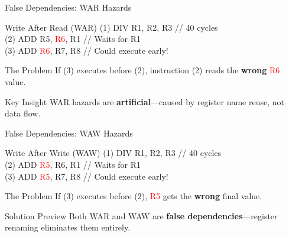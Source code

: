 \documentclass[aspectratio=169,12pt]{beamer}
\begin{document}
\begin{frame}{False Dependencies: WAR Hazards}
    \begin{exampleblock}{Write After Read (WAR)}
        {\ttfamily\footnotesize
        (1) DIV R1, R2, R3  // 40 cycles\\
        (2) ADD R5, \textcolor{red}{R6}, R1  // Waits for R1\\
        (3) ADD \textcolor{red}{R6}, R7, R8  // Could execute early!
        }
    \end{exampleblock}
    
    \begin{block}{The Problem}
        If (3) executes before (2), instruction (2) reads the \textbf{wrong} \textcolor{red}{R6} value.
    \end{block}
    
    \begin{alertblock}{Key Insight}
        WAR hazards are \textbf{artificial}—caused by register name reuse, not data flow.
    \end{alertblock}
\end{frame}

\begin{frame}{False Dependencies: WAW Hazards}
    \begin{exampleblock}{Write After Write (WAW)}
        {\ttfamily\footnotesize
        (1) DIV R1, R2, R3  // 40 cycles\\
        (2) ADD \textcolor{red}{R5}, R6, R1  // Waits for R1\\
        (3) ADD \textcolor{red}{R5}, R7, R8  // Could execute early!
        }
    \end{exampleblock}
    
    \begin{block}{The Problem}
        If (3) executes before (2), \textcolor{red}{R5} gets the \textbf{wrong} final value.
    \end{block}
    
    \begin{alertblock}{Solution Preview}
        Both WAR and WAW are \textbf{false dependencies}—register renaming eliminates them entirely.
    \end{alertblock}
\end{frame}
\end{document}
